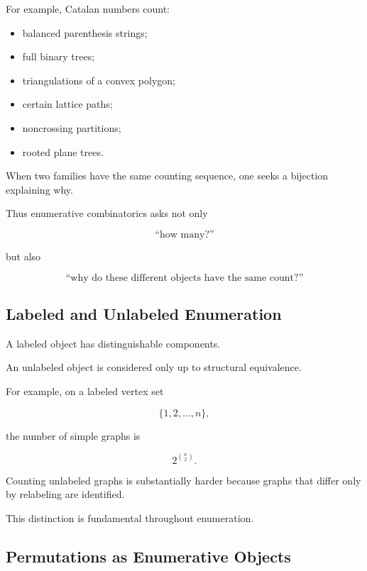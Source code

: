 For example, Catalan numbers count:

\begin{itemize}
    \item balanced parenthesis strings;
    \item full binary trees;
    \item triangulations of a convex polygon;
    \item certain lattice paths;
    \item noncrossing partitions;
    \item rooted plane trees.
\end{itemize}

When two families have the same counting sequence, one seeks a
bijection explaining why.

Thus enumerative combinatorics asks not only

\[
\text{``how many?''}
\]

but also

\[
\boxed{
\text{``why do these different objects have the same count?''}
}
\]

\subsection{Labeled and Unlabeled Enumeration}
\label{subsec:labeled-unlabeled-enumeration}

A labeled object has distinguishable components.

An unlabeled object is considered only up to structural equivalence.

For example, on a labeled vertex set

\[
\{1,2,\ldots,n\},
\]

the number of simple graphs is

\[
\boxed{
2^{\binom{n}{2}}.
}
\]

Counting unlabeled graphs is substantially harder because graphs that
differ only by relabeling are identified.

This distinction is fundamental throughout enumeration.

\subsection{Permutations as Enumerative Objects}
\label{subsec:enumerating-permutations}

